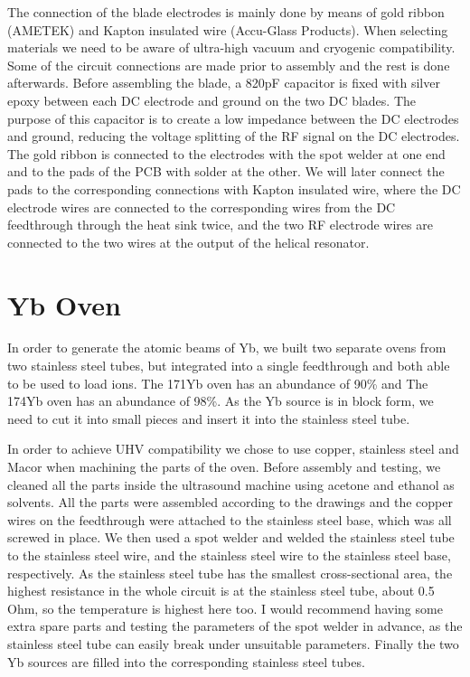 The connection of the blade electrodes is mainly done by means of gold ribbon (AMETEK) and Kapton insulated wire (Accu-Glass Products). When selecting materials we need to be aware of ultra-high vacuum and cryogenic compatibility. Some of the circuit connections are made prior to assembly and the rest is done afterwards. Before assembling the blade, a 820pF capacitor is fixed with silver epoxy between each DC electrode and ground on the two DC blades. The purpose of this capacitor is to create a low impedance between the DC electrodes and ground, reducing the voltage splitting of the RF signal on the DC electrodes. The gold ribbon is connected to the electrodes with the spot welder at one end and to the pads of the PCB with solder at the other. We will later connect the pads to the corresponding connections with Kapton insulated wire, where the DC electrode wires are connected to the corresponding wires from the DC feedthrough through the heat sink twice, and the two RF electrode wires are connected to the two wires at the output of the helical resonator.



\section{Yb Oven}

In order to generate the atomic beams of Yb, we built two separate ovens from two stainless steel tubes, but integrated into a single feedthrough and both able to be used to load ions. The 171Yb oven has an abundance of 90\% and The 174Yb oven has an abundance of 98\%. As the Yb source is in block form, we need to cut it into small pieces and insert it into the stainless steel tube.

In order to achieve UHV compatibility we chose to use copper, stainless steel and Macor when machining the parts of the oven. Before assembly and testing, we cleaned all the parts inside the ultrasound machine using acetone and ethanol as solvents. All the parts were assembled according to the drawings and the copper wires on the feedthrough were attached to the stainless steel base, which was all screwed in place. We then used a spot welder and welded the stainless steel tube to the stainless steel wire, and the stainless steel wire to the stainless steel base, respectively. As the stainless steel tube has the smallest cross-sectional area, the highest resistance in the whole circuit is at the stainless steel tube, about 0.5 Ohm, so the temperature is highest here too. I would recommend having some extra spare parts and testing the parameters of the spot welder in advance, as the stainless steel tube can easily break under unsuitable parameters. Finally the two Yb sources are filled into the corresponding stainless steel tubes.

